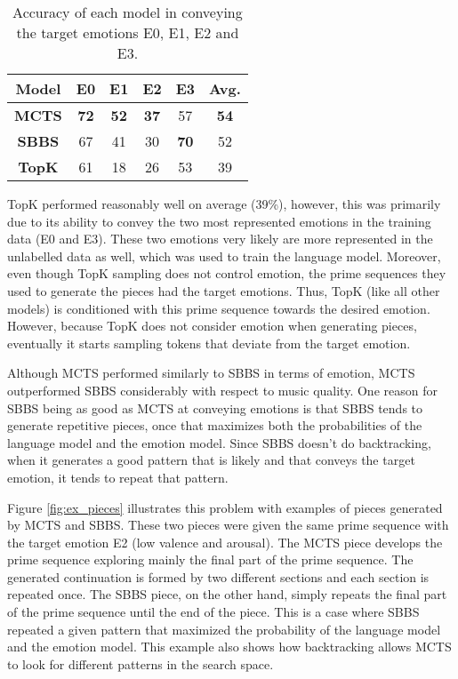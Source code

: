 \begin{table}[h]
    \centering
    \begin{tabular}{cccccc}
    \toprule
    \textbf{Model} & \textbf{E0} & \textbf{E1}  & \textbf{E2} & \textbf{E3} & \textbf{Avg.} \\
    \midrule
    \textbf{MCTS} & \textbf{72} & \textbf{52} & \textbf{37} & 57 & \textbf{54} \\
    \textbf{SBBS} & 67 & 41 & 30 & \textbf{70} & 52 \\
    \textbf{TopK} & 61 & 18 & 26 & 53 & 39 \\
    \bottomrule
    \end{tabular}
    \caption{Accuracy of each model in conveying the target emotions E0, E1, E2 and E3. }
    \label{tab:emotion}
\end{table}

TopK performed reasonably well on average (39\%), however, this was primarily due to its ability to convey the two most represented emotions in the training data (E0 and E3). These two emotions very likely are more represented in the unlabelled data as well, which was used to train the language model. Moreover, even though TopK sampling does not control emotion, the prime sequences they used to generate the pieces had the target emotions. Thus, TopK (like all other models) is conditioned with this prime sequence towards the desired emotion. However, because TopK does not consider emotion when generating pieces, eventually it starts sampling tokens that deviate from the target emotion.

Although MCTS performed similarly to SBBS in terms of emotion, MCTS outperformed SBBS considerably with respect to music quality. One reason for SBBS being as good as MCTS at conveying emotions is that SBBS tends to generate repetitive pieces, once that maximizes both the probabilities of the language model and the emotion model. Since SBBS doesn't do backtracking, when it generates a good pattern that is likely and that conveys the target emotion, it tends to repeat that pattern.

Figure \ref{fig:ex_pieces} illustrates this problem with examples of pieces generated by MCTS and SBBS. These two pieces were given the same prime sequence with the target emotion E2 (low valence and arousal). The MCTS piece develops the prime sequence exploring mainly the final part of the prime sequence. The generated continuation is formed by two different sections and each section is repeated once. The SBBS piece, on the other hand, simply repeats the final part of the prime sequence until the end of the piece. This is a case where SBBS repeated a given pattern that maximized the probability of the language model and the emotion model. This example also shows how backtracking allows MCTS to look for different patterns in the search space.

